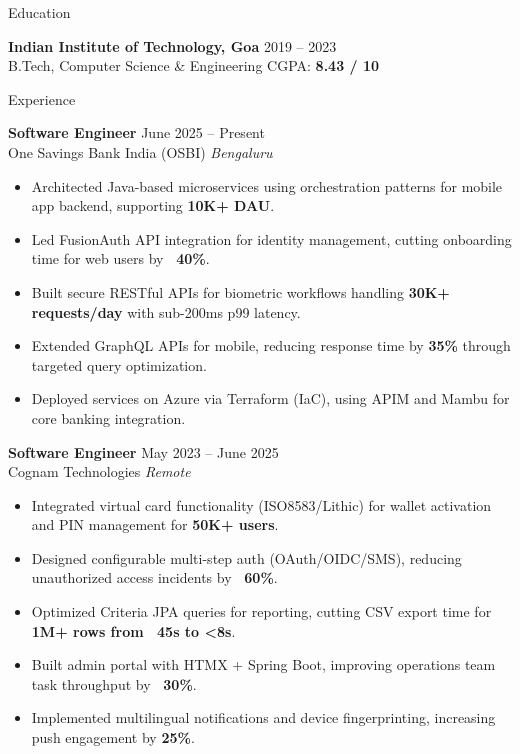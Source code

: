 \documentclass{resume}
\begin{document}
\begin{rSection}{Education}

{\bf Indian Institute of Technology, Goa} \hfill 2019 – 2023\\
B.Tech, Computer Science \& Engineering \hfill CGPA: \textbf{8.43 / 10}

\end{rSection}

\begin{rSection}{Experience}

\textbf{Software Engineer} \hfill June 2025 – Present\\
One Savings Bank India (OSBI) \hfill \textit{Bengaluru}
\begin{itemize}
    \itemsep-0.6em
    \item Architected Java-based microservices using orchestration patterns for mobile app backend, supporting \textbf{10K+ DAU}.
    \item Led FusionAuth API integration for identity management, cutting onboarding time for web users by \textbf{~40\%}.
    \item Built secure RESTful APIs for biometric workflows handling \textbf{30K+ requests/day} with sub-200ms p99 latency.
    \item Extended GraphQL APIs for mobile, reducing response time by \textbf{35\%} through targeted query optimization.
    \item Deployed services on Azure via Terraform (IaC), using APIM and Mambu for core banking integration.
\end{itemize}

\textbf{Software Engineer} \hfill May 2023 – June 2025\\
Cognam Technologies \hfill \textit{Remote}
\begin{itemize}
    \itemsep-0.6em
    \item Integrated virtual card functionality (ISO8583/Lithic) for wallet activation and PIN management for \textbf{50K+ users}.
    \item Designed configurable multi-step auth (OAuth/OIDC/SMS), reducing unauthorized access incidents by \textbf{~60\%}.
    \item Optimized Criteria JPA queries for reporting, cutting CSV export time for \textbf{1M+ rows from ~45s to <8s}.
    \item Built admin portal with HTMX + Spring Boot, improving operations team task throughput by \textbf{~30\%}.
    \item Implemented multilingual notifications and device fingerprinting, increasing push engagement by \textbf{25\%}.
\end{itemize}


\end{rSection}
\end{document}
